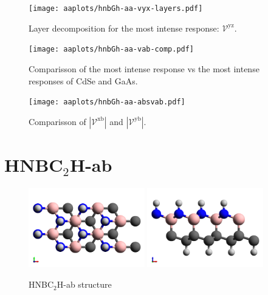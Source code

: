 \documentclass{article}
\let\Oldsection\section
\renewcommand{\section}{\FloatBarrier\Oldsection}
\begin{document}
\begin{figure}[ht]
    \centering
    \texttt{[image: aaplots/hnbGh-aa-vyx-layers.pdf]}
    \caption{Layer decomposition for the most intense response:
    $\mathcal{V}^{\mathrm{yz}}$.}
    \label{fig:aa-lay}
\end{figure}

\begin{figure}[ht]
    \centering
    \texttt{[image: aaplots/hnbGh-aa-vab-comp.pdf]}
    \caption{Comparisson of the most intense response vs the most intense
    responses of CdSe and GaAs.}
    \label{fig:aa-comp}
\end{figure}


\begin{figure}[ht]
    \centering
    \texttt{[image: aaplots/hnbGh-aa-absvab.pdf]}
    \caption{Comparisson of $|\mathcal{V}^{\mathrm{xb}}|$ and $|\mathcal{V}^{\mathrm{yb}}|$.}    
    \label{fig:aa-xbybcomp}
\end{figure}




\section{HNBC$_{2}$H-ab} %
\label{sec:ab}

\begin{figure}[h]
    \centering
    \includegraphics[width=0.45\textwidth]{../hnbGh-ab/hnbGh-ab-figures/hnbGh-ab-1}
    \includegraphics[width=0.45\textwidth]{../hnbGh-ab/hnbGh-ab-figures/hnbGh-ab-2}
    \caption{HNBC$_{2}$H-ab structure}
    \label{fig:abstruc}
\end{figure}
\end{document}
